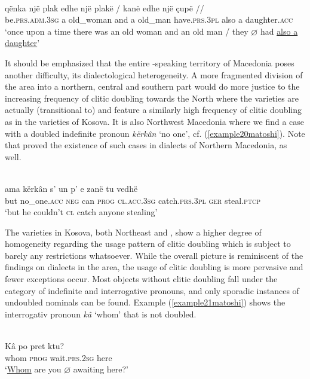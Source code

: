 \documentclass[output=paper]{langsci/langscibook}
\begin{document}
\ea \label{example19matoshi} 
	\\
	\gll qënka një plak edhe një plakë / kanë edhe një çupë //\\
	be\textsc{.prs.adm.3sg} a old\_woman and a old\_man {} have.\textsc{prs.3pl} also a daughter.\textsc{acc}\\
	\glt ‘once upon a time there was an old woman and an old man / they $\varnothing$ had \uline{also a daughter}’
 \z

It should be emphasized that the entire -speaking territory of Macedonia poses another difficulty, its dialectological heterogeneity. A more fragmented division of the area into a northern, central and southern part would do more justice to the increasing frequency of clitic doubling towards the North where the varieties are actually (transitional to)  and feature a similarly high frequency of clitic doubling as in the  varieties of Kosova. It is also Northwest Macedonia where we find a case with a doubled indefinite pronoun \textit{kërkân} ‘no one’, cf. (\ref{example20matoshi}). Note that \citet{Friedman2006} proved the existence of such cases in  dialects of Northern Macedonia, as well.

\ea \label{example20matoshi} 
	\\
	\gll ama kërkân s' un p' e zanë tu vedhë \\
	but no\_one\textsc{.acc} \textsc{neg} can \textsc{prog} \textsc{cl.acc.3sg} catch.\textsc{prs.3pl} \textsc{ger} steal.\textsc{ptcp}\\
	\glt ‘but he couldn't \textsc{cl} catch anyone stealing’
  \z

The varieties in Kosova, both Northeast and , show a higher degree of homogeneity regarding the usage pattern of clitic doubling which is subject to barely any restrictions whatsoever. While the overall picture is reminiscent of the findings on  dialects in the  area, the usage of clitic doubling is more pervasive and fewer exceptions occur. Most objects without clitic doubling fall under the category of indefinite and interrogative pronouns, and only sporadic instances of undoubled nominals can be found. Example (\ref{example21matoshi}) shows the interrogativ pronoun \textit{kâ} ‘whom’ that is not doubled.

\ea \label{example21matoshi} 
	\\
	\gll Kâ po pret ktu?\\
	whom \textsc{prog} wait.\textsc{prs.2sg} here\\
	\glt ‘\uline{Whom} are you $\varnothing$ awaiting here?’
 \z
\end{document}
